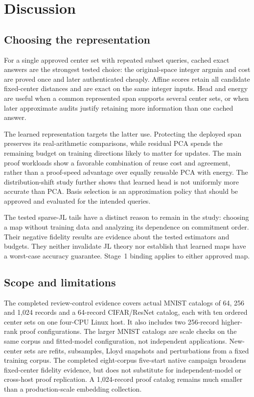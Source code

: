 \section{Discussion}\label{sec:discussion}
\subsection{Choosing the representation}
For a single approved center set with repeated subset queries, cached exact answers are the strongest tested choice: the original-space integer argmin and cost are proved once and later authenticated cheaply. Affine scores retain all candidate fixed-center distances and are exact on the same integer inputs. Head and energy are useful when a common represented span supports several center sets, or when later approximate audits justify retaining more information than one cached answer.

The learned representation targets the latter use. Protecting the deployed span preserves its real-arithmetic comparisons, while residual PCA spends the remaining budget on training directions likely to matter for updates. The main proof workloads show a favorable combination of reuse cost and agreement, rather than a proof-speed advantage over equally reusable PCA with energy. The distribution-shift study further shows that learned head is not uniformly more accurate than PCA. Basis selection is an approximation policy that should be approved and evaluated for the intended queries.

The tested sparse-JL tails have a distinct reason to remain in the study: choosing a map without training data and analyzing its dependence on commitment order. Their negative fidelity results are evidence about the tested estimators and budgets. They neither invalidate JL theory nor establish that learned maps have a worst-case accuracy guarantee. Stage~1 binding applies to either approved map.

\subsection{Scope and limitations}
The completed review-control evidence covers actual MNIST catalogs of 64, 256 and 1,024 records and a 64-record CIFAR/ResNet catalog, each with ten ordered center sets on one four-CPU Linux host. It also includes two 256-record higher-rank proof configurations. The larger MNIST catalogs are scale checks on the same corpus and fitted-model configuration, not independent applications. New-center sets are refits, subsamples, Lloyd snapshots and perturbations from a fixed training corpus. The completed eight-corpus five-start native campaign broadens fixed-center fidelity evidence, but does not substitute for independent-model or cross-host proof replication. A 1,024-record proof catalog remains much smaller than a production-scale embedding collection.

